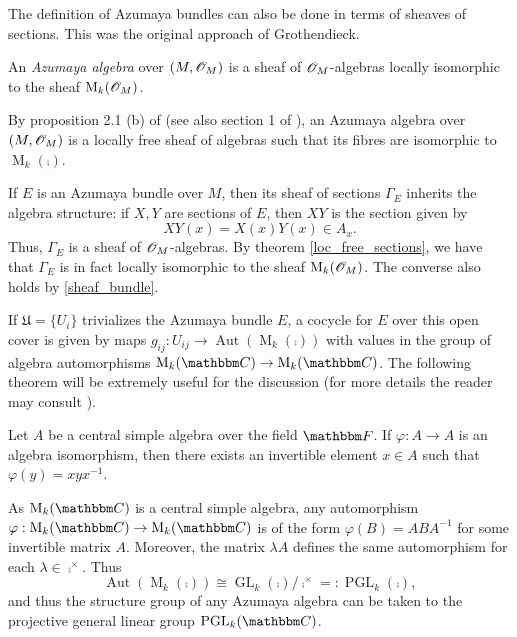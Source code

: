 The definition of Azumaya bundles can also be done in terms of sheaves of sections. This was the original approach of Grothendieck.

\begin{defi}
An \emph{Azumaya algebra} over $(M,\mathscr{O}_M)$ is a sheaf of $\mathscr{O}_M$-algebras locally isomorphic to the sheaf $\operatorname{M}_k(\mathscr{O}_M)$.
\end{defi}

\begin{obs}\label{algebra_fibres}
By proposition 2.1 (b) of \cite{milne80:_etale_cohom} (see also section 1 of \cite{grothendieck68:_le_group_de_brauer_i}), an Azumaya algebra over $(M,\mathscr{O}_M)$  is a locally free sheaf of algebras such that its fibres are isomorphic to $\operatorname{M}_k(\comp)$.
\end{obs}

If $E$ is an Azumaya bundle over $M$, then its sheaf of sections $\Gamma_E$ inherits the algebra structure: if $X,Y$ are sections of $E$, then $XY$ is the section given by
$$XY(x)=X(x)Y(x)\in A_x.$$
Thus, $\Gamma_E$ is a sheaf of $\mathscr{O}_M$-algebras. By theorem \ref{loc_free_sections}, we have that $\Gamma_E$ is in fact locally isomorphic to the sheaf $\operatorname{M}_k(\mathscr{O}_M)$. The converse also holds by \ref{sheaf_bundle}.

If $\mathfrak{U}=\{U_{i}\}$ trivializes the Azumaya bundle $E$, a cocycle for $E$ over this open cover is given by maps $g_{ij}:U_{ij}\to \operatorname{Aut}(\operatorname{M}_k(\comp ))$ with values in the group of algebra automorphisms $\opnm{M}_k(\comp )\to \opnm{M}_k(\comp )$. The following theorem will be extremely useful for the discussion (for more details the reader may consult \cite{kn:lorenz_2}).

\begin{theorem}
Let $A$ be a central simple algebra over the field $\field$. If $\varphi :A\to A$ is an algebra isomorphism, then there exists an invertible element $x\in A$ such that $\varphi (y)=xyx^{-1}$.
\end{theorem}

As $\opnm{M}_k(\comp )$ is a central simple algebra, any automorphism $\varphi :\opnm{M}_k(\comp )\to \opnm{M}_k(\comp )$ is of the form $\varphi (B)=ABA^{-1}$ for some invertible matrix $A$. Moreover, the matrix $\lambda A$ defines the same automorphism for each $\lambda \in \comp^{\times }$. Thus
$$\operatorname{Aut}(\operatorname{M}_k(\comp ))\cong \operatorname{GL}_k(\comp )  /\comp^{\times}=:\operatorname{PGL}_k(\comp ),$$
and thus the structure group of any Azumaya algebra can be taken to the projective general linear group $\opnm{PGL}_k(\comp )$.


